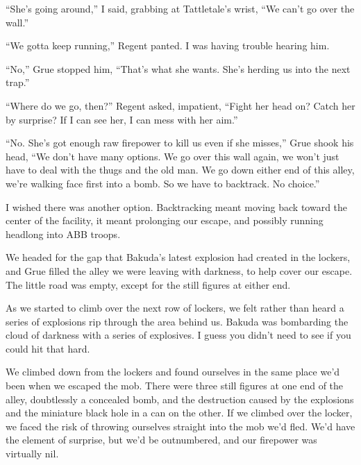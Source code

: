 ``She's going around,'' I said, grabbing at Tattletale's wrist, ``We can't go over the wall.''



``We gotta keep running,'' Regent panted.  I was having trouble hearing him.



``No,'' Grue stopped him, ``That's what she wants.  She's herding us into the next trap.''



``Where do we go, then?'' Regent asked, impatient, ``Fight her head on?  Catch her by surprise?  If I can see her, I can mess with her aim.''



``No.  She's got enough raw firepower to kill us even if she misses,'' Grue shook his head, ``We don't have many options.  We go over this wall again, we won't just have to deal with the thugs and the old man.  We go down either end of this alley, we're walking face first into a bomb.  So we have to backtrack.  No choice.''



I wished there was another option.  Backtracking meant moving back toward the center of the facility, it meant prolonging our escape, and possibly running headlong into ABB troops.



We headed for the gap that Bakuda's latest explosion had created in the lockers, and Grue filled the alley we were leaving with darkness, to help cover our escape.  The little road was empty, except for the still figures at either end.



As we started to climb over the next row of lockers, we felt rather than heard a series of explosions rip through the area behind us.  Bakuda was bombarding the cloud of darkness with a series of explosives.  I guess you didn't need to see if you could hit that hard.



We climbed down from the lockers and found ourselves in the same place we'd been when we escaped the mob.  There were three still figures at one end of the alley, doubtlessly a concealed bomb, and the destruction caused by the explosions and the miniature black hole in a can on the other.  If we climbed over the locker, we faced the risk of throwing ourselves straight into the mob we'd fled.  We'd have the element of surprise, but we'd be outnumbered, and our firepower was virtually nil.



